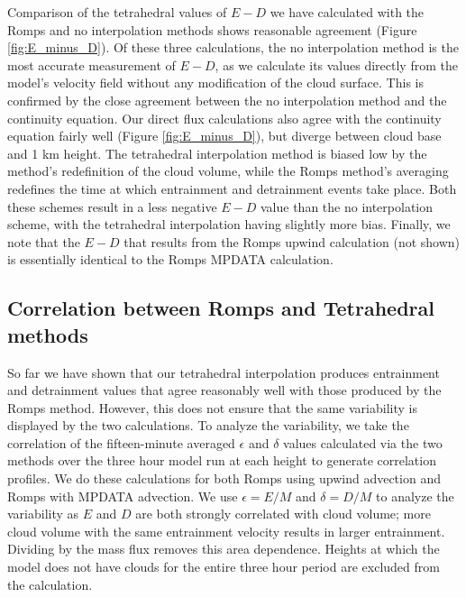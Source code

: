 \documentclass[12pt]{article}
\begin{document}
Comparison of the tetrahedral values of $E-D$ we have calculated with the
Romps and no interpolation methods shows reasonable agreement (Figure 
\ref{fig:E_minus_D}).  Of these three calculations, the no interpolation method 
is the most accurate measurement of $E-D$, as we calculate its values directly 
from the model's velocity field without any modification of the cloud surface.
This is confirmed by the close agreement between the no interpolation method 
and the continuity equation.  Our direct flux calculations also agree with the 
continuity equation fairly well (Figure \ref{fig:E_minus_D}), but diverge 
between cloud base and 1 km height.  The tetrahedral interpolation method is 
biased low by the method's redefinition of the cloud volume, while the Romps 
method's averaging redefines the time at which entrainment and detrainment 
events take place.  Both these schemes result in a less negative $E-D$ value 
than the no interpolation scheme, with the tetrahedral interpolation having 
slightly more bias.  Finally, we note that the $E-D$ that results from the 
Romps upwind calculation (not shown) is essentially identical to the Romps 
MPDATA calculation.


\subsection{Correlation between Romps and Tetrahedral methods}

So far we have shown that our tetrahedral interpolation produces entrainment 
and detrainment values that agree reasonably well with those produced by the 
Romps method.  However, this does not ensure that the same variability is 
displayed by the two calculations.  To analyze the variability, we take the 
correlation of the fifteen-minute averaged $\epsilon$ and $\delta$ values 
calculated via the two methods over the three hour model run at each height 
to generate correlation profiles.  We do these calculations for both Romps 
using upwind advection and Romps with MPDATA advection.  We use 
$\epsilon = E/M$ and $\delta = D/M$ to analyze the variability as $E$ and $D$ 
are both strongly correlated with cloud volume; more cloud volume with the same 
entrainment velocity results in larger entrainment.  Dividing by the mass flux 
removes this area dependence.  Heights at which the model does not have clouds 
for the entire three hour period are excluded from the calculation.  
\end{document}
